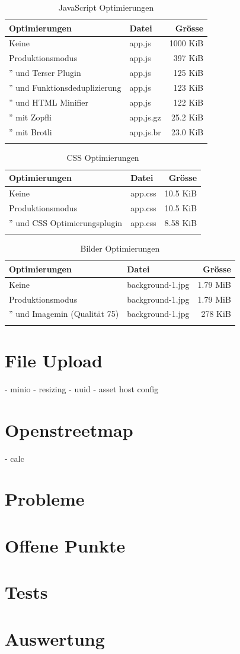 \begin{longtable}[]{@{}llr@{}}
  \toprule
  \textbf{Optimierungen} & \textbf{Datei} & \textbf{Grösse}\tabularnewline
  \midrule
  Keine & app.js & 1000 KiB\tabularnewline
  Produktionsmodus & app.js & 397 KiB\tabularnewline
  ” und Terser Plugin & app.js & 125 KiB\tabularnewline
  ” und Funktionsdeduplizierung & app.js & 123 KiB\tabularnewline
  ” und HTML Minifier & app.js & 122 KiB\tabularnewline
  ” mit Zopfli & app.js.gz & 25.2 KiB\tabularnewline
  ” mit Brotli & app.js.br & 23.0 KiB\tabularnewline
  \bottomrule
  \caption{JavaScript Optimierungen}
\end{longtable}

\begin{longtable}[]{@{}llr@{}}
  \toprule
  \textbf{Optimierungen} & \textbf{Datei} & \textbf{Grösse}\tabularnewline
  \midrule
  Keine & app.css & 10.5 KiB\tabularnewline
  Produktionsmodus & app.css & 10.5 KiB\tabularnewline
  ” und CSS Optimierungsplugin & app.css & 8.58 KiB\tabularnewline
  \bottomrule
  \caption{CSS Optimierungen}
\end{longtable}

\begin{longtable}[]{@{}llr@{}}
  \toprule
  \textbf{Optimierungen} & \textbf{Datei} & \textbf{Grösse}\tabularnewline
  \midrule
  Keine & background-1.jpg & 1.79 MiB\tabularnewline
  Produktionsmodus & background-1.jpg & 1.79 MiB\tabularnewline
  ” und Imagemin (Qualität 75) & background-1.jpg & 278 KiB\tabularnewline
  \bottomrule
  \caption{Bilder Optimierungen}
\end{longtable}

\clearpage
\section{File Upload}

- minio
- resizing
- uuid
- asset host config

\section{Openstreetmap}

- calc

\clearpage
\section{Probleme}

\clearpage
\section{Offene Punkte}

\clearpage
\section{Tests}

\section{Auswertung}
